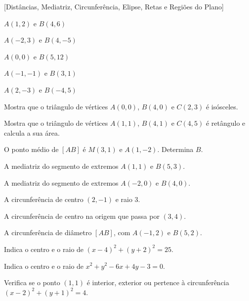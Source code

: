 \documentclass[12pt]{article}
\begin{document}
[Distâncias, Mediatriz, Circunferência, Elipse, Retas e Regiões do Plano]


\begin{exercicios}
  \item $A(1, 2)$ e $B(4, 6)$
  \item $A(-2, 3)$ e $B(4, -5)$
  \item $A(0, 0)$ e $B(5, 12)$
  \item $A(-1, -1)$ e $B(3, 1)$
  \item $A(2, -3)$ e $B(-4, 5)$
  \item Mostra que o triângulo de vértices $A(0,0)$, $B(4,0)$ e $C(2,3)$ é isósceles.
  \item Mostra que o triângulo de vértices $A(1,1)$, $B(4,1)$ e $C(4,5)$ é retângulo e calcula a sua área.
  \item O ponto médio de $[AB]$ é $M(3, 1)$ e $A(1, -2)$. Determina $B$.
\end{exercicios}

\begin{exercicios}
  \item A mediatriz do segmento de extremos $A(1, 1)$ e $B(5, 3)$.
  \item A mediatriz do segmento de extremos $A(-2, 0)$ e $B(4, 0)$.
  \item A circunferência de centro $(2, -1)$ e raio 3.
  \item A circunferência de centro na origem que passa por $(3, 4)$.
  \item A circunferência de diâmetro $[AB]$, com $A(-1, 2)$ e $B(5, 2)$.
  \item Indica o centro e o raio de $(x - 4)^2 + (y + 2)^2 = 25$.
  \item Indica o centro e o raio de $x^2 + y^2 - 6x + 4y - 3 = 0$.
  \item Verifica se o ponto $(1, 1)$ é interior, exterior ou pertence à circunferência $(x - 2)^2 + (y + 1)^2 = 4$.
\end{exercicios}
\end{document}
